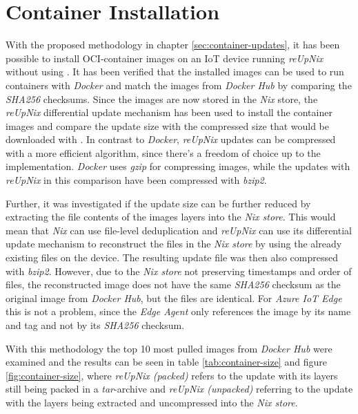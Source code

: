 \section{Container Installation}
With the proposed methodology in chapter \ref{sec:container-updates}, it has been possible
to install \ac{OCI}-container images on an \ac{IoT} device running \textit{reUpNix} without 
using .
It has been verified that the installed images can be used to run containers with \textit{Docker}
and match the images from \textit{Docker Hub} by comparing the \textit{SHA256} checksums.
Since the images are now stored in the \textit{Nix} store, the \textit{reUpNix}
differential update mechanism has been used to install the container images and compare the update size
with the compressed size that would be downloaded with . In
contrast to \textit{Docker}, \textit{reUpNix} updates can be compressed with a
more efficient algorithm, since there's a freedom of choice up to the implementation.
\textit{Docker} uses \textit{gzip} for compressing images, while the updates with
\textit{reUpNix} in this comparison have been compressed with \textit{bzip2}.

Further, it was investigated if the update size can be further reduced by extracting
the file contents of the images layers into the \textit{Nix store}. This would mean
that \textit{Nix} can use file-level deduplication and \textit{reUpNix} can use
its differential update mechanism to reconstruct the files in the \textit{Nix store}
by using the already existing files on the device. The resulting update file was
then also compressed with \textit{bzip2}. However, due to the \textit{Nix store}
not preserving timestamps and order of files,
the reconstructed image does not have the same \textit{SHA256} checksum as the
original image from \textit{Docker Hub}, but the files are identical. For
\textit{Azure IoT Edge} this is not a problem, since the \textit{Edge Agent} only
references the image by its name and tag and not by its \textit{SHA256} checksum.


With this methodology the top 10 most pulled images from \textit{Docker Hub}
were examined and the results can be seen in table \ref{tab:container-size} and figure
\ref{fig:container-size}, where \textit{reUpNix (packed)} refers to the update
with its layers still being packed in a \textit{tar}-archive and \textit{reUpNix (unpacked)}
referring to the update with the layers being extracted and uncompressed into the
\textit{Nix store}.
\clearpage

